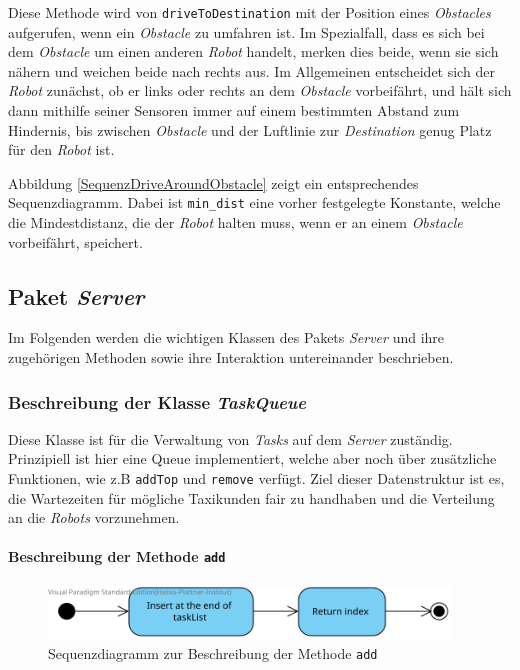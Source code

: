 			Diese Methode wird von \texttt{driveToDestination} mit der Position eines \textit{Obstacles} aufgerufen, 
			wenn ein \textit{Obstacle} zu umfahren ist. 
			Im Spezialfall, dass es sich bei dem \textit{Obstacle} um einen anderen \textit{Robot} handelt, merken dies beide, wenn sie sich nähern und weichen beide nach rechts aus. 
			Im Allgemeinen entscheidet sich der \emph{Robot} zunächst, ob er links oder rechts an dem \textit{Obstacle} vorbeifährt, 
			und hält sich dann mithilfe seiner Sensoren immer auf einem bestimmten Abstand zum Hindernis, bis zwischen 
			\textit{Obstacle} und der Luftlinie zur \textit{Destination} genug Platz für den \textit{Robot} ist.
			
			Abbildung \ref{SequenzDriveAroundObstacle} zeigt ein entsprechendes Sequenzdiagramm. 
			Dabei ist \texttt{min\_dist} eine vorher festgelegte Konstante, welche die Mindestdistanz, die der \textit{Robot} halten muss, wenn er an einem \textit{Obstacle} vorbeifährt, speichert.
	
\pagebreak
	
\subsection{Paket \textit{Server}}
	Im Folgenden werden die wichtigen Klassen des Pakets \textit{Server} 
	und ihre zugehörigen Methoden sowie ihre Interaktion untereinander beschrieben. 


	\subsubsection{Beschreibung der Klasse \textit{TaskQueue}}
	
	Diese Klasse ist für die Verwaltung von \textit{Tasks} auf dem \textit{Server} zuständig. Prinzipiell ist hier eine Queue implementiert, welche aber noch über zusätzliche Funktionen, wie z.B \texttt{addTop} und \texttt{remove} verfügt. Ziel dieser Datenstruktur ist es, die Wartezeiten für mögliche Taxikunden fair zu handhaben und die Verteilung an die \textit{Robots} vorzunehmen.
	
			\paragraph{Beschreibung der Methode \texttt{add}}		
			\begin{figure}[H]
			\centering
			\includegraphics[width=0.95\textwidth]{img/add}
			\caption{Sequenzdiagramm zur Beschreibung der Methode \texttt{add}}
			\label{SequenzQueueAdd}
			\end{figure}
			
